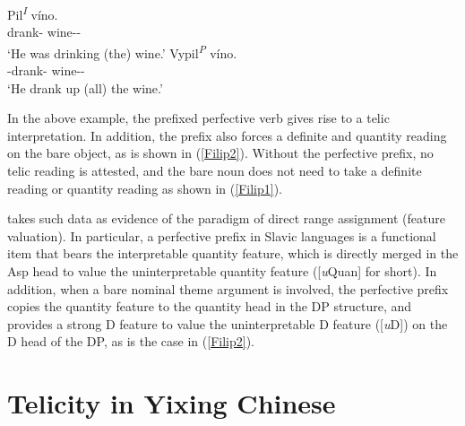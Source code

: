 \documentclass[output=paper]{langsci/langscibook}
\begin{document}
\begin{exe}
\ex {} \parencite[62]{filip1997}
    \begin{xlist}
	\ex\label{Filip1} \gll Pil\textsuperscript{\emph{I}} v\'ino.\\
	        {drank-\Sg{}{}} {wine-\Sg{}-\Acc{}} \\
	    \glt \enquote*{He was drinking (the) wine.}
    \ex\label{Filip2} \gll  Vypil\textsuperscript{\emph{P}} v\'ino.\\
            {\Pfv{}-drank-\Sg{}{}} {wine-\Sg{}-\Acc{}} \\
        \glt \enquote*{He drank up (all) the wine.}
\end{xlist}
\end{exe}

In the above example, the prefixed perfective verb gives rise to a telic
interpretation. In     addition, the prefix also forces a definite and quantity
reading on the bare object, as is shown in (\ref{Filip2}). Without the
perfective prefix, no telic reading is attested, and the bare noun does not
need to take a definite reading or quantity reading as shown in (\ref{Filip1}).

\textcite{Borer2005b} takes such data as evidence of the paradigm of direct
range assignment (feature valuation). In particular, a perfective prefix in
Slavic languages is a functional item that bears the interpretable quantity
feature, which is directly merged in the Asp head to value the
uninterpretable quantity feature ([\emph{u}Quan] for short). In addition, when
a bare nominal theme argument is involved, the perfective prefix copies the
quantity feature to the quantity head in the DP structure, and provides a
strong D feature to value the uninterpretable D feature ([\emph{u}D])
on the D head of the DP, as is the case in (\ref{Filip2}).

\section{Telicity in Yixing Chinese}\label{sec:17.4}
\end{document}
